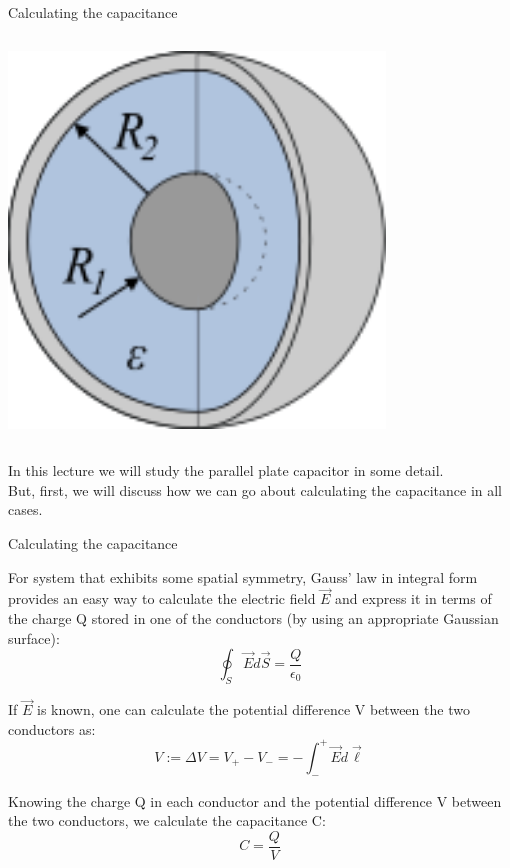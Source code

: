 \begin{frame}{Calculating the capacitance}
\begin{columns}
\begin{column}{0.33\textwidth}
\begin{center}
     \includegraphics[width=0.75\textwidth]{./images/schematics/capacitors_spherical_1.png}\\
   \end{center}
  \end{column}
\end{columns}

\vspace{0.2cm}
In this lecture we will study the parallel plate capacitor in some detail.\\

\vspace{0.2cm}
But, first, we will discuss how we can go about calculating the capacitance in all cases.\\

\end{frame}

%
%
%

\begin{frame}{Calculating the capacitance}

For system that exhibits some spatial symmetry,
Gauss' law in integral form provides an easy way to calculate the electric field $\vec{E}$
and express it in terms of the charge Q stored in one of the conductors
(by using an appropriate Gaussian surface):
\begin{equation*}
  \oint_{S} \vec{E} d\vec{S} = \frac{Q}{\epsilon_0}
\end{equation*}

If $\vec{E}$ is known, one can calculate the potential difference V between the two conductors as:
\begin{equation*}
  V := {\Delta}V = V_{+} - V_{-} = - \int_{-}^{+} \vec{E} d\vec{\ell}
\end{equation*}

Knowing the charge Q in each conductor and
the potential difference V between the two conductors,
we calculate the capacitance C:
\begin{equation*}
  C = \frac{Q}{V}
\end{equation*}

\end{frame}


